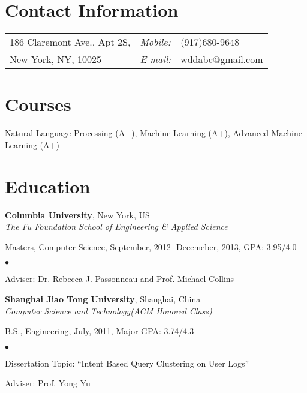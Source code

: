 \documentclass[margin,line]{res}
\newenvironment{list1}{
  \begin{list}{\ding{113}}{%
      \setlength{\itemsep}{0in}
      \setlength{\parsep}{0in} \setlength{\parskip}{0in}
      \setlength{\topsep}{0in} \setlength{\partopsep}{0in} 
      \setlength{\leftmargin}{0.17in}}}{\end{list}}
\newenvironment{list2}{
  \begin{list}{$\bullet$}{%
      \setlength{\itemsep}{0in}
      \setlength{\parsep}{0in} \setlength{\parskip}{0in}
      \setlength{\topsep}{0in} \setlength{\partopsep}{0in} 
      \setlength{\leftmargin}{0.2in}}}{\end{list}}
\begin{document}

\begin{resume}
\section{\sc Contact Information}
\vspace{.05in}
\begin{tabular}{@{}p{2.5in}p{0.55in}p{2in}}
186 Claremont Ave., Apt 2S, & {\it Mobile:}& (917)680-9648 \\  
New York, NY, 10025& {\it E-mail:}& wddabc@gmail.com\\
\end{tabular}

\section{\sc Courses}
Natural Language Processing (A+), Machine Learning (A+), Advanced Machine Learning (A+)
\section{\sc Education}

{\bf Columbia University}, New York, US\\
{\em The Fu Foundation School of Engineering \& Applied Science} 
\begin{list1}
\item[] Masters, Computer Science, September, 2012- Decemeber, 2013, GPA: 3.95/4.0\\
\begin{list2}
\vspace*{-4mm}
\item Adviser: Dr. Rebecca J. Passonneau and Prof. Michael Collins 
\end{list2}
\end{list1}
\vspace*{-4mm}
{\bf Shanghai Jiao Tong University}, Shanghai, China\\
{\em Computer Science and Technology(ACM Honored Class)} 
\vspace*{-.0in}
\begin{list1}
\item[] B.S., Engineering, July, 2011, Major GPA: 3.74/4.3
\begin{list2}
\vspace*{.05in}
\item Dissertation Topic:  ``Intent Based Query Clustering on User Logs'' 
\item Adviser: Prof. Yong Yu 
\end{list2}
\end{list1}

\end{resume}
\end{document}
